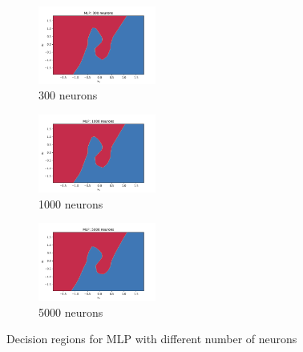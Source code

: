 \documentclass[a4paper]{article}    %
\begin{document}
\begin{figure}[H]
    \hfill
    \begin{subfigure}{0.32\textwidth}
        \centering
        \includegraphics[width=3.85cm]{decision_regions_300}
        \caption{300 neurons}
        \label{fig:mlp-300_neurons}
    \end{subfigure}
    \hfill
    \begin{subfigure}{0.32\textwidth}
        \centering
        \includegraphics[width=3.85cm]{decision_regions_1000}
        \caption{1000 neurons}
        \label{fig:mlp-1000_neurons}
    \end{subfigure}
    \hfill
    \begin{subfigure}{0.32\textwidth}
        \centering
        \includegraphics[width=3.85cm]{decision_regions_5000}
        \caption{5000 neurons}
        \label{fig:mlp-5000_neurons}
    \end{subfigure}
    \hfill
    \caption{Decision regions for MLP with different number of neurons}
    \label{fig:mlp-decision_regions_N_neurons}
\end{figure}



\end{document}
